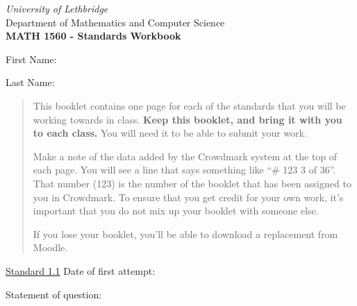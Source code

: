 \documentclass[12pt]{article}
\newcommand{\skipline}{\vspace{12pt}}
\begin{document}
\author{Instructor: Sean Fitzpatrick}
\thispagestyle{empty}
\begin{center}
\emph{University of Lethbridge}\\
Department of Mathematics and Computer Science\\
{\bf MATH 1560 - Standards Workbook}\\
\end{center}
\skipline \skipline \skipline \noindent \skipline

\skipline
First Name:\underline{\hspace{348pt}}\\
\skipline

\vspace{1cm}

Last Name:\underline{\hspace{351pt}}



\vspace{2cm}

\begin{quote}
This booklet contains one page for each of the standards that you will be working towards in class. \textbf{Keep this booklet, and bring it with you to each class.} You will need it to be able to submit your work.

Make a note of the data added by the Crowdmark system at the top of each page. You will see a line that says something like ``\# 123  3 of 36''. That number (123) is the number of the booklet that has been assigned to you in Crowdmark. To ensure that you get credit for your own work, it's important that you do not mix up your booklet with someone else.

If you lose your booklet, you'll be able to download a replacement from Moodle.
\end{quote}




\newpage


\underline{Standard 1.1} \hspace{6cm} Date of first attempt:



\bigskip

Statement of question:

\vspace{1in}
\end{document}
